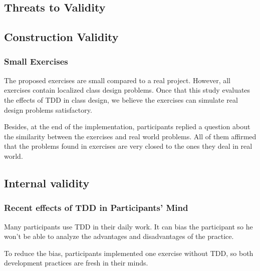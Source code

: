 \documentclass[conference]{IEEEtran}
\begin{document}
\begin{framed}
\begin{framed}
\section{Threats to Validity}
\label{cap:ameacas}

\subsection{Construction Validity}

\subsubsection{Small Exercises}

The proposed exercises are small compared to a real project. However, all exercises
contain localized class design problems. Once that this study evaluates the effects
of TDD in class design, we believe the exercises can simulate real design problems
satisfactory.

Besides, at the end of the implementation, participants replied a question about the
similarity between the exercises and real world problems. All of them affirmed that
the problems found in exercises are very closed to the ones they deal in real world.

\subsection{Internal validity}

\subsubsection{Recent effects of TDD in Participants' Mind}

Many participants use TDD in their daily work. It can bias the participant so he
won't be able to analyze the advantages and disadvantages of the practice.

To reduce the bias, participants implemented one exercise without TDD, so both
development practices are fresh in their minds.


\end{framed}
\end{framed}
\end{document}
